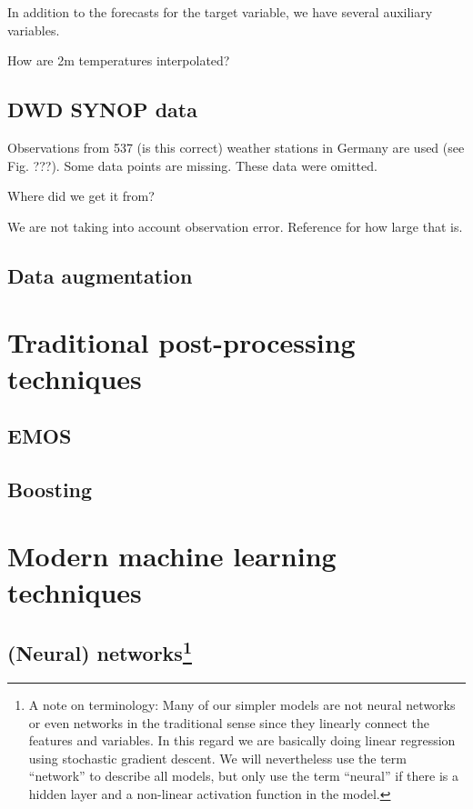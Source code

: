 \documentclass[a4paper,10pt]{scrartcl}
\begin{document}
In addition to the forecasts for the target variable, we have several auxiliary variables.

How are 2m temperatures interpolated?

\subsection{DWD SYNOP data}
Observations from 537 (is this correct) weather stations in Germany are used (see Fig. ???). Some data points are missing. These data were omitted.

Where did we get it from?

We are not taking into account observation error. Reference for how large that is.

\subsection{Data augmentation}

\section{Traditional post-processing techniques}

\subsection{EMOS}

\subsection{Boosting}

\section{Modern machine learning techniques}

\subsection{(Neural) networks\protect\footnote{A note on terminology: Many of our simpler models are not neural networks or even networks in the traditional sense since they linearly connect the features and variables. In this regard we are basically doing linear regression using stochastic gradient descent. We will nevertheless use the term ``network'' to describe all models, but only use the term ``neural'' if there is a hidden layer and a non-linear activation function in the model.}}
\end{document}
